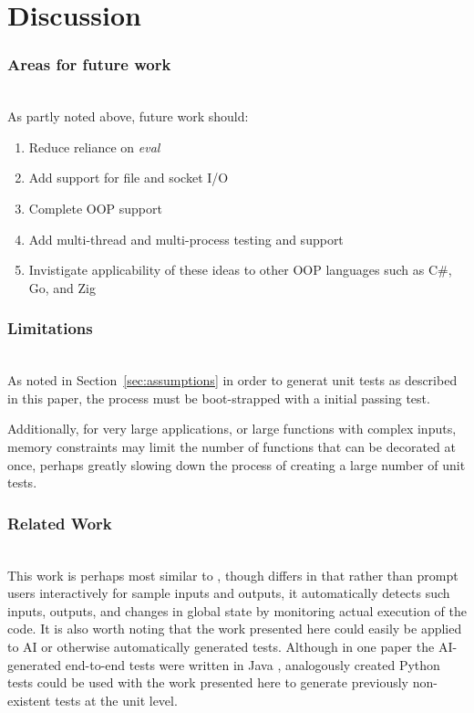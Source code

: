 \section{Discussion}\label{sec:discussion}

\subsubsection{Areas for future work}\label{sec:tuning-2}
\hfill\\

As partly noted above, future work should: 
\begin{enumerate}
  \item Reduce reliance on \textit{eval}
  \item Add support for file and socket I/O
  \item Complete OOP support
  \item Add multi-thread and multi-process testing and support
  \item Invistigate applicability of these ideas to other OOP languages such as C\#, Go, and Zig
\end{enumerate}

\subsubsection{Limitations}\label{sec:limitations}
\hfill\\

As noted in Section~\ref{sec:assumptions} in order to 
generat unit tests as described in this paper, the 
process must be boot-strapped with a initial passing test.

Additionally, for very large applications, or large
functions with complex inputs, memory constraints may 
limit the number of functions that can be decorated at once,
perhaps greatly slowing down the process of creating 
a large number of unit tests.

\subsubsection{Related Work}\label{sec:related-work}
\hfill\\

This work is perhaps most similar to 
\cite{lahiri2023interactivecodegenerationtestdriven}, though
differs in that rather than prompt users interactively for sample inputs and
outputs, it automatically detects such inputs, outputs, and changes in global
state by monitoring actual execution of the code.  It is also worth noting 
that the work presented here could easily be applied to AI or otherwise 
automatically generated tests.  Although in one paper the AI-generated end-to-end tests 
were written in Java \cite{leotta2024ai}, analogously created Python tests could
be used with the work presented here to generate previously non-existent 
tests at the unit level.

